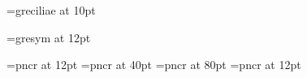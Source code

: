 \def\grett#1{%
{\tt #1}%
\relax %
}

\newcount\tempfactor %

\def\setgregorianfont#1{%
\tempfactor = \the\grefactor %
\multiply\tempfactor by 100000 %
\global\font\gregorianfont=#1 at \the\tempfactor sp%
\relax%
}

\font\gregorianfont=greciliae at 10pt

\font\gregoriansymbolfont=gresym at 12pt

\def\gretextformat#1{%
{\textfont #1}%
\relax %
}

\font\textfont=pncr at 12pt
\font\fontofinitial=pncr at 40pt
\font\fontofbiginitial=pncr at 80pt
\font\fontoftranslation=pncr at 12pt

\def\setgrefactor#1{%
\global\grefactor=#1\relax %
\setgreverticalspaces %
\setgrespaces %
\generatelines %
\setgregorianfont{greciliae}%
\relax %
}
